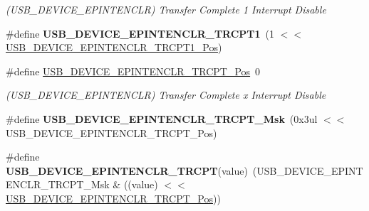 \begin{DoxyCompactItemize}
\begin{DoxyCompactList}\small\item\em (U\+S\+B\+\_\+\+D\+E\+V\+I\+C\+E\+\_\+\+E\+P\+I\+N\+T\+E\+N\+C\+L\+R) Transfer Complete 1 Interrupt Disable \end{DoxyCompactList}\item 
\hypertarget{group___s_a_m_l21___u_s_b_ga2a2de217ab6a39746add512ab48c0e03}{}\#define {\bfseries U\+S\+B\+\_\+\+D\+E\+V\+I\+C\+E\+\_\+\+E\+P\+I\+N\+T\+E\+N\+C\+L\+R\+\_\+\+T\+R\+C\+P\+T1}~(1 $<$$<$ \hyperlink{group___s_a_m_l21___u_s_b_gaae736286cfbb572fcea8e5d21ca08658}{U\+S\+B\+\_\+\+D\+E\+V\+I\+C\+E\+\_\+\+E\+P\+I\+N\+T\+E\+N\+C\+L\+R\+\_\+\+T\+R\+C\+P\+T1\+\_\+\+Pos})\label{group___s_a_m_l21___u_s_b_ga2a2de217ab6a39746add512ab48c0e03}

\item 
\hypertarget{group___s_a_m_l21___u_s_b_ga049c9272ae142ffc562966dc3debdd0f}{}\#define \hyperlink{group___s_a_m_l21___u_s_b_ga049c9272ae142ffc562966dc3debdd0f}{U\+S\+B\+\_\+\+D\+E\+V\+I\+C\+E\+\_\+\+E\+P\+I\+N\+T\+E\+N\+C\+L\+R\+\_\+\+T\+R\+C\+P\+T\+\_\+\+Pos}~0\label{group___s_a_m_l21___u_s_b_ga049c9272ae142ffc562966dc3debdd0f}

\begin{DoxyCompactList}\small\item\em (U\+S\+B\+\_\+\+D\+E\+V\+I\+C\+E\+\_\+\+E\+P\+I\+N\+T\+E\+N\+C\+L\+R) Transfer Complete x Interrupt Disable \end{DoxyCompactList}\item 
\hypertarget{group___s_a_m_l21___u_s_b_gaf5f4e9555d58b985f4bbe3f05382c43c}{}\#define {\bfseries U\+S\+B\+\_\+\+D\+E\+V\+I\+C\+E\+\_\+\+E\+P\+I\+N\+T\+E\+N\+C\+L\+R\+\_\+\+T\+R\+C\+P\+T\+\_\+\+Msk}~(0x3ul $<$$<$ U\+S\+B\+\_\+\+D\+E\+V\+I\+C\+E\+\_\+\+E\+P\+I\+N\+T\+E\+N\+C\+L\+R\+\_\+\+T\+R\+C\+P\+T\+\_\+\+Pos)\label{group___s_a_m_l21___u_s_b_gaf5f4e9555d58b985f4bbe3f05382c43c}

\item 
\hypertarget{group___s_a_m_l21___u_s_b_ga32a91659ae0ef4c5260701d04262d117}{}\#define {\bfseries U\+S\+B\+\_\+\+D\+E\+V\+I\+C\+E\+\_\+\+E\+P\+I\+N\+T\+E\+N\+C\+L\+R\+\_\+\+T\+R\+C\+P\+T}(value)~(U\+S\+B\+\_\+\+D\+E\+V\+I\+C\+E\+\_\+\+E\+P\+I\+N\+T\+E\+N\+C\+L\+R\+\_\+\+T\+R\+C\+P\+T\+\_\+\+Msk \& ((value) $<$$<$ \hyperlink{group___s_a_m_l21___u_s_b_ga049c9272ae142ffc562966dc3debdd0f}{U\+S\+B\+\_\+\+D\+E\+V\+I\+C\+E\+\_\+\+E\+P\+I\+N\+T\+E\+N\+C\+L\+R\+\_\+\+T\+R\+C\+P\+T\+\_\+\+Pos}))\label{group___s_a_m_l21___u_s_b_ga32a91659ae0ef4c5260701d04262d117}


\end{DoxyCompactItemize}
